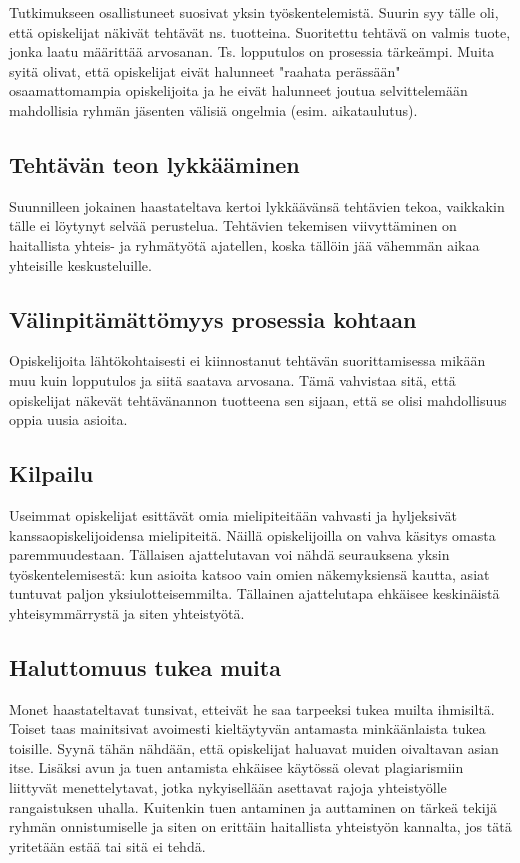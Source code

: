 \documentclass[finnish]{article}
\begin{document}
Tutkimukseen osallistuneet suosivat yksin työskentelemistä. Suurin syy tälle oli, että opiskelijat näkivät tehtävät ns. tuotteina. Suoritettu tehtävä on valmis tuote, jonka laatu määrittää arvosanan. Ts. lopputulos on prosessia tärkeämpi. Muita syitä olivat, että opiskelijat eivät halunneet "raahata perässään" osaamattomampia opiskelijoita ja he eivät halunneet joutua selvittelemään mahdollisia ryhmän jäsenten välisiä ongelmia (esim. aikataulutus).

\subsection{Tehtävän teon lykkääminen}

Suunnilleen jokainen haastateltava kertoi lykkäävänsä tehtävien tekoa, vaikkakin tälle ei löytynyt selvää perustelua. Tehtävien tekemisen viivyttäminen on haitallista yhteis- ja ryhmätyötä ajatellen, koska tällöin jää vähemmän aikaa yhteisille keskusteluille.

\subsection{Välinpitämättömyys prosessia kohtaan}

Opiskelijoita lähtökohtaisesti ei kiinnostanut tehtävän suorittamisessa mikään muu kuin lopputulos ja siitä saatava arvosana. Tämä vahvistaa sitä, että opiskelijat näkevät tehtävänannon tuotteena sen sijaan, että se olisi mahdollisuus oppia uusia asioita.

\subsection{Kilpailu}

Useimmat opiskelijat esittävät omia mielipiteitään vahvasti ja hyljeksivät kanssaopiskelijoidensa mielipiteitä. Näillä opiskelijoilla on vahva käsitys omasta paremmuudestaan. Tällaisen ajattelutavan voi nähdä seurauksena yksin työskentelemisestä: kun asioita katsoo vain omien näkemyksiensä kautta, asiat tuntuvat paljon yksiulotteisemmilta. Tällainen ajattelutapa ehkäisee keskinäistä yhteisymmärrystä ja siten yhteistyötä.

\subsection{Haluttomuus tukea muita}

Monet haastateltavat tunsivat, etteivät he saa tarpeeksi tukea muilta ihmisiltä. Toiset taas mainitsivat avoimesti kieltäytyvän antamasta minkäänlaista tukea toisille. Syynä tähän nähdään, että opiskelijat haluavat muiden oivaltavan asian itse. Lisäksi avun ja tuen antamista ehkäisee käytössä olevat plagiarismiin liittyvät menettelytavat, jotka nykyisellään asettavat rajoja yhteistyölle rangaistuksen uhalla. Kuitenkin tuen antaminen ja auttaminen on tärkeä tekijä ryhmän onnistumiselle ja siten on erittäin haitallista yhteistyön kannalta, jos tätä yritetään estää tai sitä ei tehdä.
\end{document}
